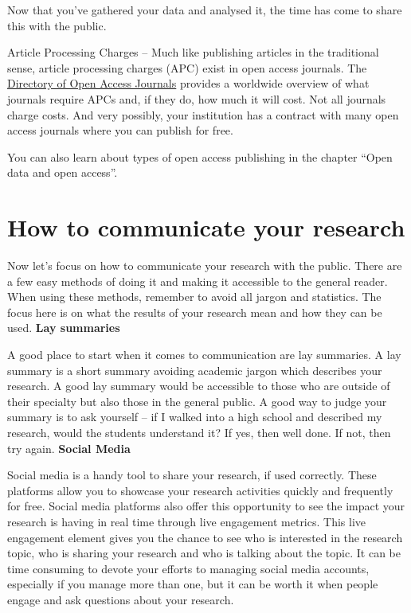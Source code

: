\documentclass[
]{book}
\begin{document}
Now that you've gathered your data and analysed it, the time has come to share this with the public.

Article Processing Charges -- Much like publishing articles in the traditional sense, article processing charges (APC) exist in open access journals. The \href{https://doaj.org/}{Directory of Open Access Journals} provides a worldwide overview of what journals require APCs and, if they do, how much it will cost. Not all journals charge costs. And very possibly, your institution has a contract with many open access journals where you can publish for free.

You can also learn about types of open access publishing in the chapter ``Open data and open access''.

\hypertarget{how-to-communicate-your-research}{%
\section{How to communicate your research}\label{how-to-communicate-your-research}}

Now let's focus on how to communicate your research with the public. There are a few easy methods of doing it and making it accessible to the general reader. When using these methods, remember to avoid all jargon and statistics. The focus here is on what the results of your research mean and how they can be used. \textbf{Lay summaries}

A good place to start when it comes to communication are lay summaries. A lay summary is a short summary avoiding academic jargon which describes your research. A good lay summary would be accessible to those who are outside of their specialty but also those in the general public. A good way to judge your summary is to ask yourself -- if I walked into a high school and described my research, would the students understand it? If yes, then well done. If not, then try again. \textbf{Social Media}

Social media is a handy tool to share your research, if used correctly. These platforms allow you to showcase your research activities quickly and frequently for free. Social media platforms also offer this opportunity to see the impact your research is having in real time through live engagement metrics. This live engagement element gives you the chance to see who is interested in the research topic, who is sharing your research and who is talking about the topic. It can be time consuming to devote your efforts to managing social media accounts, especially if you manage more than one, but it can be worth it when people engage and ask questions about your research.
\end{document}
